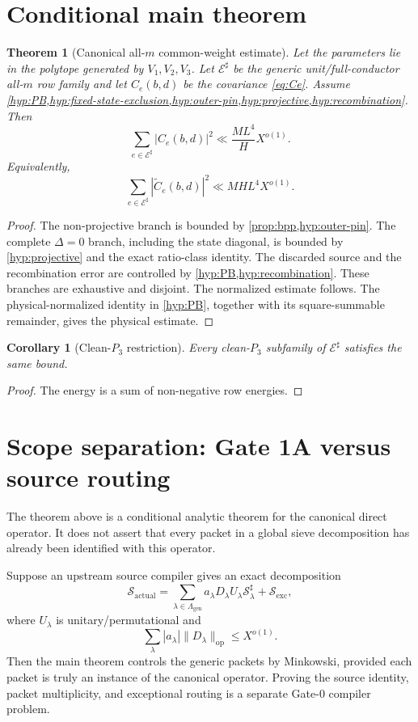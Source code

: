 \documentclass[11pt]{article}
\newtheorem{theorem}{Theorem}[section]
\newtheorem{corollary}[corollary]{Corollary}
\theoremstyle{definition}
\newcommand{\1}{\mathbf 1}
\begin{document}
\section{Conditional main theorem}
\begin{theorem}[Canonical all-$m$ common-weight estimate]
\label{thm:main}
Let the parameters lie in the polytope generated by $V_1,V_2,V_3$.  Let
$\mathcal E^\sharp$ be the generic unit/full-conductor all-$m$ row family and
let $C_e(b,d)$ be the covariance \eqref{eq:Ce}.  Assume
\cref{hyp:PB,hyp:fixed-state-exclusion,hyp:outer-pin,hyp:projective,hyp:recombination}.
Then
\[
   \boxed{\sum_{e\in\mathcal E^\sharp}|C_e(b,d)|^2
          \ll \frac{ML^4}{H}X^{o(1)}.}
\]
Equivalently,
\[
   \boxed{\sum_{e\in\mathcal E^\sharp}|\widetilde C_e(b,d)|^2
          \ll MHL^4X^{o(1)}.}
\]
\end{theorem}
\begin{proof}
The non-projective branch is bounded by
\cref{prop:bpp,hyp:outer-pin}.  The complete $\Delta=0$ branch, including the
state diagonal, is bounded by \cref{hyp:projective} and the exact ratio-class
identity.  The discarded source and the recombination error are controlled by
\cref{hyp:PB,hyp:recombination}.  These branches are exhaustive and disjoint.
The normalized estimate follows.  The physical-normalized identity in
\cref{hyp:PB}, together with its square-summable remainder, gives the physical
estimate.
\end{proof}

\begin{corollary}[Clean-$P_3$ restriction]
Every clean-$P_3$ subfamily of $\mathcal E^\sharp$ satisfies the same bound.
\end{corollary}
\begin{proof}
The energy is a sum of non-negative row energies.
\end{proof}

\section{Scope separation: Gate 1A versus source routing}
The theorem above is a conditional analytic theorem for the canonical direct operator.
It does not assert that every packet in a global sieve decomposition has
already been identified with this operator.

Suppose an upstream source compiler gives an exact decomposition
\[
  \mathcal S_{\mathrm{actual}}
  =\sum_{\lambda\in\Lambda_{\mathrm{gen}}}
      a_\lambda D_\lambda U_\lambda\mathcal S_\lambda^\sharp
    +\mathcal S_{\mathrm{exc}},
\]
where $U_\lambda$ is unitary/permutational and
\[
   \sum_\lambda |a_\lambda|\|D_\lambda\|_{\mathrm{op}}\le X^{o(1)}.
\]
Then the main theorem controls the generic packets by Minkowski, provided each
packet is truly an instance of the canonical operator. Proving the source
identity, packet multiplicity, and exceptional routing is a separate Gate-0
compiler problem.
\end{document}
